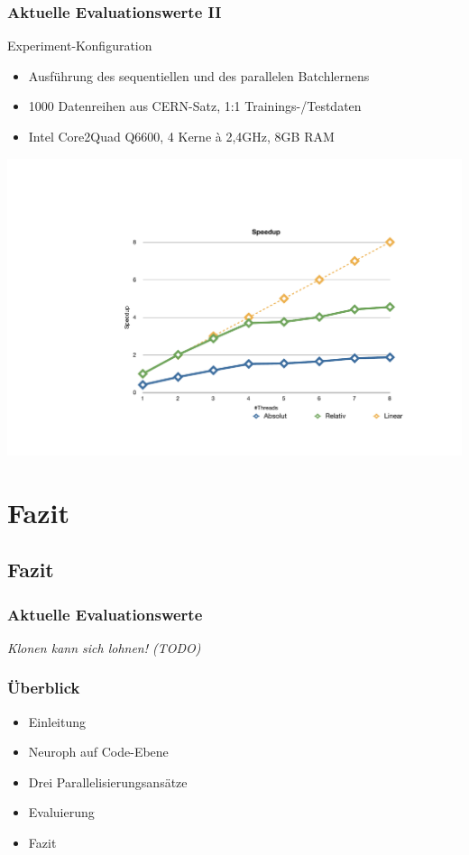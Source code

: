 \documentclass[18pt]{beamer}
\begin{document}
	\begin{frame}\frametitle{Aktuelle Evaluationswerte II}
		\begin{block}{Experiment-Konfiguration}
			\begin{itemize}
				\item Ausführung des sequentiellen und des parallelen Batchlernens
				\item 1000 Datenreihen aus CERN-Satz, 1:1 Trainings-/Testdaten
				\item Intel Core2Quad Q6600, 4 Kerne à 2,4GHz, 8GB RAM
			\end{itemize}
		\end{block}
		\begin{center}
			\includegraphics[scale=0.33]{Grafiken/batch_speedup.pdf}
		\end{center}

	\end{frame}
	
	\section{Fazit}
	\subsection{Fazit}
	\begin{frame}\frametitle{Aktuelle Evaluationswerte}
		\textit{Klonen kann sich lohnen! (TODO)}
	\end{frame}
	
	\begin{frame}[c]\frametitle{Überblick}
		\begin{itemize}
		   \item Einleitung \checkmark
		   \item Neuroph auf Code-Ebene \checkmark
		   \item Drei Parallelisierungsansätze \checkmark
		   \item Evaluierung \checkmark
		   \item Fazit
		\end{itemize}
	\end{frame}
\end{document}
